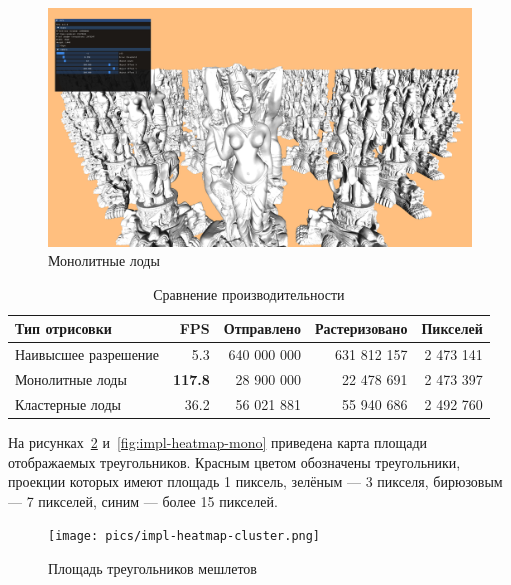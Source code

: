 \begin{figure}[H]
    \centering
    \includegraphics[width=\textwidth]{pics/comparison-3.png}
    \caption{Монолитные лоды}
    \label{fig:impl-mono}
\end{figure}

\begin{table}[h]
    \centering
    \begin{tabular}{lrrrr}
        \hline \hline
        Тип отрисовки
        & FPS
        & Отправлено
        & Растеризовано
        & Пикселей \\ \hline
        Наивысшее разрешение
        & 5.3
        & 640 000 000
        & 631 812 157
        & 2 473 141 \\
        Монолитные лоды
        & \textbf{117.8}
        & 28 900 000
        & 22 478 691
        & 2 473 397 \\
        Кластерные лоды
        & 36.2
        & 56 021 881
        & 55 940 686
        & 2 492 760 \\
        \hline \hline
    \end{tabular}

    \caption{Сравнение производительности}
    \label{tab:fps}
\end{table}

На рисунках~\ref{fig:impl-heatmap-cluster} и~\ref{fig:impl-heatmap-mono} приведена карта площади отображаемых треугольников.
Красным цветом обозначены треугольники, проекции которых имеют площадь 1 пиксель, зелёным --- 3 пикселя, бирюзовым --- 7 пикселей, синим --- более 15 пикселей.

\begin{figure}[H]
    \texttt{[image: pics/impl-heatmap-cluster.png]}
    \caption{Площадь треугольников мешлетов}
    \label{fig:impl-heatmap-cluster}
\end{figure}

